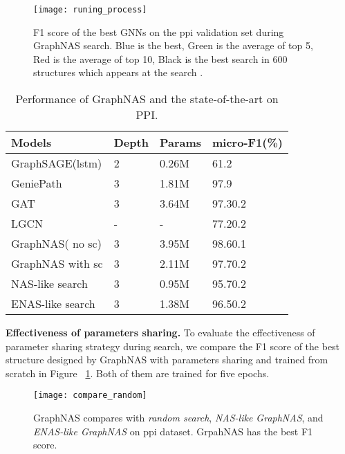 \documentclass{article}
\begin{document}
\begin{figure}
	\texttt{[image: runing\_process]}
	\caption{F1 score of the best GNNs on the ppi validation set during GraphNAS search. Blue is the best, Green is the average of top 5, Red is the average of top 10, Black is the best search in 600 structures which appears at the search .    }
	\label{fig:runing_process}
\end{figure}

\begin{table}[]
	\caption{Performance of GraphNAS and the state-of-the-art on PPI.}
	\label{PPI result}
	\begin{tabular}{l|ll|l}
		\hline
		Models    & Depth & Params  & micro-F1(\%)     \\ \hline
		GraphSAGE(lstm) &  2     &  0.26M       & 61.2       \\
GeniePath & 3  & 1.81M   &97.9  \\
		GAT       &   3    &  3.64M      & 97.30.2 \\
		LGCN      &  -     & -     & 77.20.2 \\ \hline


		GraphNAS( no sc) &	3	&	3.95M	&	 98.60.1			\\

		GraphNAS with sc&	3	&	2.11M	&	 	  97.70.2 \\
 
		NAS-like search &  3     &  0.95M    &  95.70.2                 \\ 
 
		ENAS-like search&  3     &  1.38M     &   96.50.2             \\ \hline
	\end{tabular}
\end{table}

\textbf{Effectiveness of parameters sharing.} To evaluate the effectiveness of parameter sharing strategy during search, we compare the F1 score of the best structure designed by GraphNAS with parameters sharing and trained from scratch in Figure ~\ref{fig:runing_process}. Both of them are trained for five epochs. 

\begin{figure}
	\texttt{[image: compare\_random]}
	\caption{GraphNAS compares with \textit{random search}, \textit{NAS-like GraphNAS}, and \textit{ ENAS-like GraphNAS} on ppi dataset. GrpahNAS has the best F1 score.}
	\label{fig:ppi_compare_random}
\end{figure}
\end{document}
